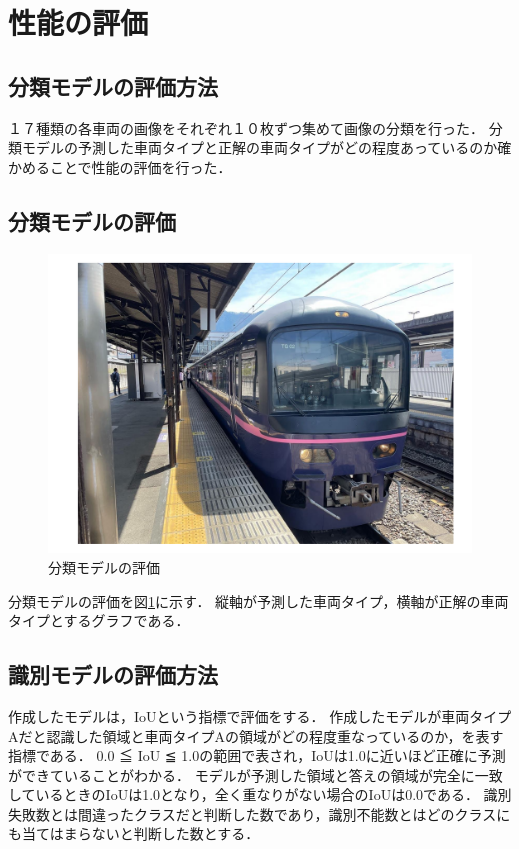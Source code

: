 \section{性能の評価}
\subsection{分類モデルの評価方法}
１７種類の各車両の画像をそれぞれ１０枚ずつ集めて画像の分類を行った．
分類モデルの予測した車両タイプと正解の車両タイプがどの程度あっているのか確かめることで性能の評価を行った．
\subsection{分類モデルの評価}
\begin{figure}	
	\centering
	\includegraphics[width=\linewidth]{fig/hana.pdf}
	\caption{分類モデルの評価}\label{CLS}
\end{figure}
分類モデルの評価を図\ref{CLS}に示す．
縦軸が予測した車両タイプ，横軸が正解の車両タイプとするグラフである．
\subsection{識別モデルの評価方法}
作成したモデルは，IoUという指標で評価をする．
作成したモデルが車両タイプAだと認識した領域と車両タイプAの領域がどの程度重なっているのか，を表す指標である．
0.0 ≦ IoU ≦ 1.0の範囲で表され，IoUは1.0に近いほど正確に予測ができていることがわかる．
モデルが予測した領域と答えの領域が完全に一致しているときのIoUは1.0となり，全く重なりがない場合のIoUは0.0である．
識別失敗数とは間違ったクラスだと判断した数であり，識別不能数とはどのクラスにも当てはまらないと判断した数とする．
